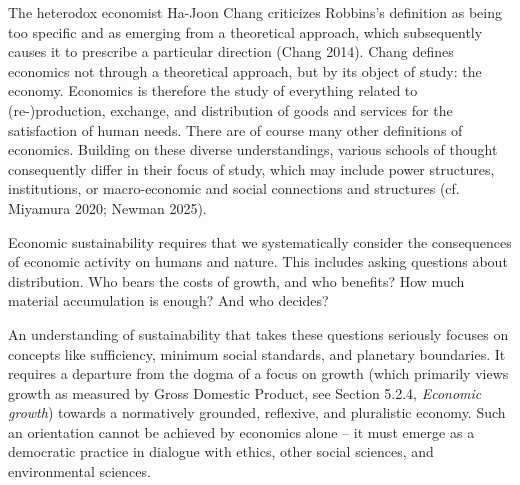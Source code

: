 \documentclass[
  a4paper,
  DIV=11,
  numbers=noendperiod,
  oneside,
  openany]{scrreprt}
\begin{document}
The heterodox economist Ha-Joon Chang criticizes Robbins's definition as
being too specific and as emerging from a theoretical approach, which
subsequently causes it to prescribe a particular direction (Chang 2014).
Chang defines economics not through a theoretical approach, but by its
object of study: the economy. Economics is therefore the study of
everything related to (re-)production, exchange, and distribution of
goods and services for the satisfaction of human needs. There are of
course many other definitions of economics. Building on these diverse
understandings, various schools of thought consequently differ in their
focus of study, which may include power structures, institutions, or
macro-economic and social connections and structures (cf. Miyamura 2020;
Newman 2025).

Economic sustainability requires that we systematically consider the
consequences of economic activity on humans and nature. This includes
asking questions about distribution. Who bears the costs of growth, and
who benefits? How much material accumulation is enough? And who decides?

An understanding of sustainability that takes these questions seriously
focuses on concepts like sufficiency, minimum social standards, and
planetary boundaries. It requires a departure from the dogma of a focus
on growth (which primarily views growth as measured by Gross Domestic
Product, see Section 5.2.4, \emph{Economic growth}) towards a
normatively grounded, reflexive, and pluralistic economy. Such an
orientation cannot be achieved by economics alone -- it must emerge as a
democratic practice in dialogue with ethics, other social sciences, and
environmental sciences.
\end{document}
